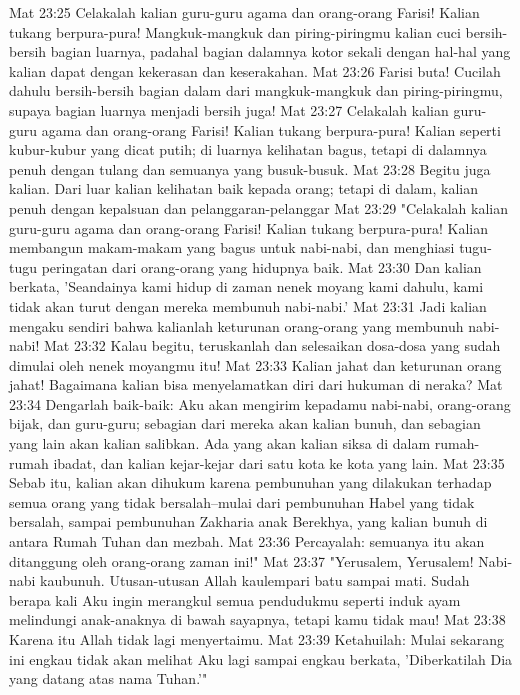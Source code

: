 Mat 23:25  Celakalah kalian guru-guru agama dan orang-orang Farisi! Kalian tukang berpura-pura! Mangkuk-mangkuk dan piring-piringmu kalian cuci bersih-bersih bagian luarnya, padahal bagian dalamnya kotor sekali dengan hal-hal yang kalian dapat dengan kekerasan dan keserakahan.
Mat 23:26  Farisi buta! Cucilah dahulu bersih-bersih bagian dalam dari mangkuk-mangkuk dan piring-piringmu, supaya bagian luarnya menjadi bersih juga!
Mat 23:27  Celakalah kalian guru-guru agama dan orang-orang Farisi! Kalian tukang berpura-pura! Kalian seperti kubur-kubur yang dicat putih; di luarnya kelihatan bagus, tetapi di dalamnya penuh dengan tulang dan semuanya yang busuk-busuk.
Mat 23:28  Begitu juga kalian. Dari luar kalian kelihatan baik kepada orang; tetapi di dalam, kalian penuh dengan kepalsuan dan pelanggaran-pelanggar
Mat 23:29  "Celakalah kalian guru-guru agama dan orang-orang Farisi! Kalian tukang berpura-pura! Kalian membangun makam-makam yang bagus untuk nabi-nabi, dan menghiasi tugu-tugu peringatan dari orang-orang yang hidupnya baik.
Mat 23:30  Dan kalian berkata, 'Seandainya kami hidup di zaman nenek moyang kami dahulu, kami tidak akan turut dengan mereka membunuh nabi-nabi.'
Mat 23:31  Jadi kalian mengaku sendiri bahwa kalianlah keturunan orang-orang yang membunuh nabi-nabi!
Mat 23:32  Kalau begitu, teruskanlah dan selesaikan dosa-dosa yang sudah dimulai oleh nenek moyangmu itu!
Mat 23:33  Kalian jahat dan keturunan orang jahat! Bagaimana kalian bisa menyelamatkan diri dari hukuman di neraka?
Mat 23:34  Dengarlah baik-baik: Aku akan mengirim kepadamu nabi-nabi, orang-orang bijak, dan guru-guru; sebagian dari mereka akan kalian bunuh, dan sebagian yang lain akan kalian salibkan. Ada yang akan kalian siksa di dalam rumah-rumah ibadat, dan kalian kejar-kejar dari satu kota ke kota yang lain.
Mat 23:35  Sebab itu, kalian akan dihukum karena pembunuhan yang dilakukan terhadap semua orang yang tidak bersalah--mulai dari pembunuhan Habel yang tidak bersalah, sampai pembunuhan Zakharia anak Berekhya, yang kalian bunuh di antara Rumah Tuhan dan mezbah.
Mat 23:36  Percayalah: semuanya itu akan ditanggung oleh orang-orang zaman ini!"
Mat 23:37  "Yerusalem, Yerusalem! Nabi-nabi kaubunuh. Utusan-utusan Allah kaulempari batu sampai mati. Sudah berapa kali Aku ingin merangkul semua pendudukmu seperti induk ayam melindungi anak-anaknya di bawah sayapnya, tetapi kamu tidak mau!
Mat 23:38  Karena itu Allah tidak lagi menyertaimu.
Mat 23:39  Ketahuilah: Mulai sekarang ini engkau tidak akan melihat Aku lagi sampai engkau berkata, 'Diberkatilah Dia yang datang atas nama Tuhan.'"
